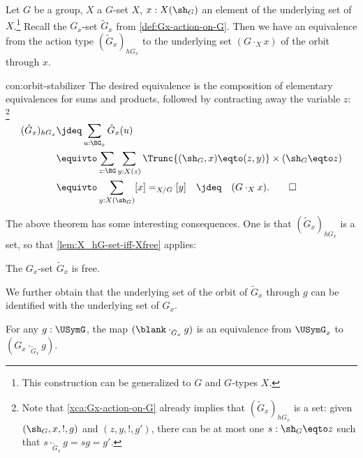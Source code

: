 \begin{construction}
  \label{con:orbit-stabilizer}
  Let $G$ be a group, $X$ a $G$-set $X$,
  $x : X(\sh_G)$ an element of the underlying set of $X$.\footnote{%
  This construction can be generalized to \inftygps $G$ and $G$-types $X$.}
  Recall the $G_x$-set $\tilde G_x$ from \cref{def:Gx-action-on-G}.
  Then we have an equivalence from the action type $(\tilde G_x)_{hG_x}$
  to the underlying set $(G\cdot_X x)$ of the orbit through $x$.
\end{construction}
\begin{implementation}{con:orbit-stabilizer}
  The desired equivalence is the composition of elementary equivalences
  for sums and products, followed by contracting away the variable $z$:
\footnote{\label{ft:action-type-tildeGx-set} 
Note that \cref{xca:Gx-action-on-G} already
implies that $(\tilde G_x)_{hG_x}$ is a set:
given $(\sh_G,x,!,g)$ and $(z,y,!,g')$, there can be at most
one $s : \sh_G \eqto z$ such that $s\cdot_{\tilde G_x} g = sg = g'$. 
}
  \begin{align*}
    (\tilde G_x)_{hG_x}
    &\jdeq \sum_{u : \BG_x}\tilde G_x(u) \\
    &\equivto \sum_{z:\BG}\sum_{y:X(z)}
    \Trunc{(\sh_G,x) \eqto (z,y)}\times (\sh_G \eqto z) \\
    &\equivto \sum_{y:X(\sh_G)}[x] =_{X/G} [y]\quad\jdeq\quad(G\cdot_X x).\qedhere
  \end{align*}
\end{implementation}

The above theorem has some interesting consequences.
One is that $(\tilde G_x)_{hG_x}$ is a set, so that
\cref{lem:X_hG-set-iff-Xfree} applies:

\begin{corollary}\label{cor:action-subgrp-free}
The $G_x$-set $\tilde G_x$ is free.
\end{corollary}

We further obtain that the underlying set of the orbit 
of $\tilde G_x$ through $g$ can be identified with the
underlying set of $G_x$.

\begin{corollary}\label{lem:cosets-Gx.g}
  For any $g:\USymG$, the map $(\blank \cdot_{\tilde G_x} g)$ is
  an equivalence from $\USymG_x$ to $(G_x \cdot_{\tilde G_x} g)$.
\end{corollary} 
 
